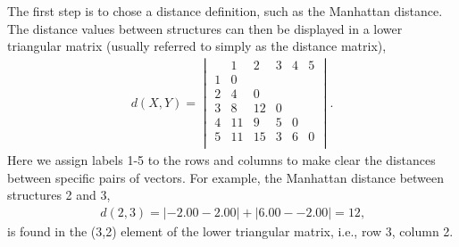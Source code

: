 The  first  step  is to  chose  a  distance  definition, such  as  the
Manhattan distance.   The distance values between  structures can then
be displayed in a lower  triangular matrix (usually referred to simply
as the distance matrix),
\begin{gather} 
d(X, Y)=
\begin{vmatrix}
   & 1  &  2   & 3 & 4 & 5 \\
1  & 0  &      &   &   &   \\
2  & 4  &  0   &   &   &   \\
3  & 8  & 12   & 0 &   &   \\
4  & 11 &  9   & 5 & 0 &   \\
5  & 11 & 15   & 3 & 6 & 0 \\
\end{vmatrix} .
\label{eq:man}
\end{gather}
Here we  assign labels 1-5 to the  rows and columns to  make clear the
distances  between  specific  pairs   of  vectors.  For  example,  the
Manhattan distance between structures 2 and 3,
\begin{gather}
d(2, 3)= |-2.00 - 2.00| + |6.00 - -2.00| = 12 \text{,}
\end{gather}
is found  in the (3,2) element  of the lower  triangular matrix, i.e.,
row 3, column 2.

